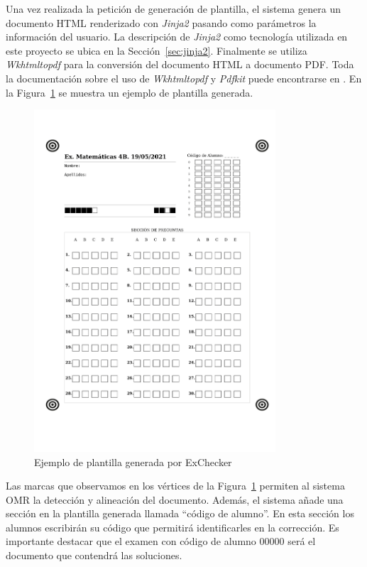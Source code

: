\documentclass[a4paper, 12pt]{book}
\begin{document}
Una vez realizada la petición de generación de plantilla, el sistema
genera un documento HTML renderizado con
\textit{Jinja2} pasando como parámetros
la información del usuario. La descripción de \textit{Jinja2} como tecnología utilizada
en este proyecto se ubica en la Sección~\ref{sec:jinja2}.
Finalmente se utiliza \textit{Wkhtmltopdf} para la 
conversión del documento HTML a documento PDF. Toda la documentación
sobre el uso de \textit{Wkhtmltopdf} y \textit{Pdfkit} puede encontrarse en
\cite{wkhtmltopdf:documentation, pdfkit:documentation}. En la
Figura~\ref{figura:ejemplo_plantilla} se muestra un ejemplo de
plantilla generada.

\begin{figure}
  \centering
  \includegraphics[width=9cm, keepaspectratio]{img/ejemplo_plantilla}
  \caption{Ejemplo de plantilla generada por ExChecker}
  \label{figura:ejemplo_plantilla}
\end{figure}

Las marcas que observamos en los vértices de la 
Figura~\ref{figura:ejemplo_plantilla} permiten al sistema OMR la
detección y alineación del documento. Además, el sistema añade una sección en la
plantilla generada llamada ``código de alumno''. En esta sección los alumnos
escribirán su código que permitirá identificarles en la corrección. Es importante
destacar que el examen con código de alumno 00000 será el documento que contendrá
las soluciones.
\end{document}
